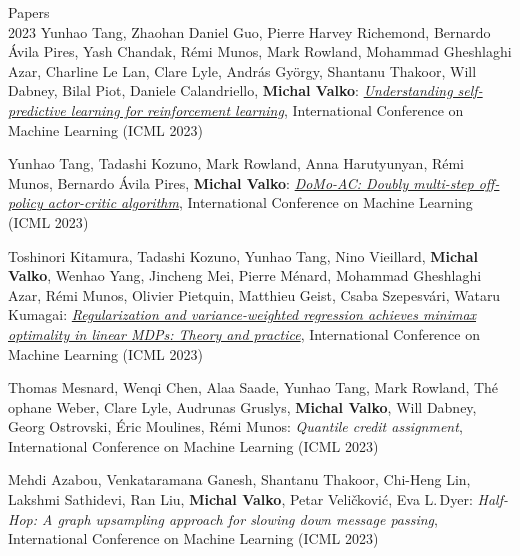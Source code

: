 \documentclass{resume}
\begin{document}
\begin{category}{Papers\\2023}
\citembullet
Yunhao Tang, Zhaohan Daniel Guo, Pierre Harvey Richemond, Bernardo \'Avila Pires, Yash Chandak, R\'emi Munos, Mark Rowland, Mohammad Gheshlaghi Azar, Charline Le Lan, Clare Lyle, Andr\'as Gy\"orgy, Shantanu Thakoor, Will Dabney, Bilal Piot, Daniele Calandriello, {\bf Michal Valko}:
\href{https://arxiv.org/pdf/2205.14211.pdf}
{\emph{Understanding self-predictive learning for reinforcement learning}},
International Conference on Machine Learning
({\sf ICML 2023}) 

\citembullet
Yunhao Tang, Tadashi Kozuno, Mark Rowland, Anna Harutyunyan, R\' emi Munos, Bernardo \'Avila  Pires,   {\bf Michal Valko}: 
\href{https://arxiv.org/pdf/2305.18501.pdf}
{\emph{DoMo-AC: Doubly multi-step off-policy actor-critic algorithm}}, 
International Conference on Machine Learning
({\sf ICML 2023}) 


\citembullet
Toshinori Kitamura, Tadashi Kozuno, Yunhao Tang, Nino Vieillard,  {\bf Michal Valko}, Wenhao Yang, Jincheng Mei, Pierre M\' enard, Mohammad Gheshlaghi Azar,  R\' emi  Munos, Olivier Pietquin, Matthieu Geist, Csaba Szepesv\' ari, Wataru Kumagai: 
\href{https://arxiv.org/pdf/2305.13185.pdf}
{\emph{Regularization and variance-weighted regression achieves minimax optimality in linear MDPs: Theory and practice}},
International Conference on Machine Learning
({\sf ICML 2023}) 


\citembullet
Thomas Mesnard, Wenqi Chen, Alaa Saade, Yunhao Tang, Mark Rowland, Th\'e ophane Weber, Clare Lyle, Audrunas Gruslys,  {\bf Michal Valko}, Will Dabney, Georg Ostrovski, \' Eric Moulines, R\' emi  Munos: 
{\emph{Quantile credit assignment}}, 
International Conference on Machine Learning
({\sf ICML 2023}) 

\citembullet
Mehdi Azabou, Venkataramana Ganesh, Shantanu Thakoor, Chi-Heng Lin, Lakshmi Sathidevi, Ran Liu,  {\bf Michal Valko}, Petar Veličkovi\' c, Eva L.\,Dyer: 
{\emph{Half-Hop: A graph upsampling approach for slowing down message passing}}, 
International Conference on Machine Learning
({\sf ICML 2023}) 
\end{category}
\end{document}
